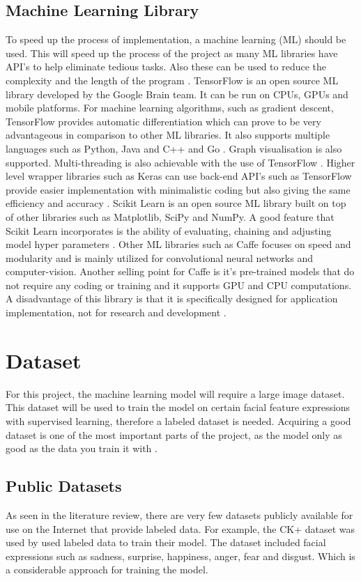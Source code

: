\subsection{Machine Learning Library}
To speed up the process of implementation, a machine learning (ML) should be used. This will speed up the process of the project as many ML libraries have API's to help eliminate tedious tasks. Also these can be used to reduce the complexity and the length of the program \citep{jain}.
TensorFlow is an open source ML library developed by the Google Brain team. It can be run on CPUs, GPUs and mobile platforms. For machine learning algorithms, such as gradient descent, TensorFlow provides automatic differentiation which can prove to be very advantageous in comparison to other ML libraries. It also supports multiple languages such as Python, Java and C++ and Go \citep{jain}. Graph visualisation is also supported. Multi-threading is also achievable with the use of TensorFlow \citep{jain}. Higher level wrapper libraries such as Keras can use back-end API's such as TensorFlow provide easier implementation with minimalistic coding but also giving the same efficiency and accuracy \citep{lee_keras}. Scikit Learn is an open source ML library built on top of other libraries such as Matplotlib, SciPy and NumPy. A good feature that Scikit Learn incorporates is the ability of evaluating, chaining and adjusting model hyper parameters \citep{jain}.
Other ML libraries such as Caffe focuses on speed and modularity and is mainly utilized for convolutional neural networks and computer-vision. Another selling point for Caffe is it's pre-trained models that do not require any coding or training and it supports GPU and CPU computations. A disadvantage of this library is that it is specifically designed for application implementation, not for research and development \citep{jain}.

\section{Dataset}
For this project, the machine learning model will require a large image dataset. This dataset will be used to train the model on certain facial feature expressions with supervised learning, therefore a labeled dataset is needed. Acquiring a good dataset is one of the most important parts of the project, as the model only as good as the data you train it with \citep{capg}.

\subsection{Public Datasets}
As seen in the literature review, there are very few datasets publicly available for use on the Internet that provide labeled data. For example, the CK+ dataset was used by \citeauthor{LOPES} used labeled data to train their model. The dataset included facial expressions such as sadness, surprise, happiness, anger, fear and disgust. Which is a considerable approach for training the model.

